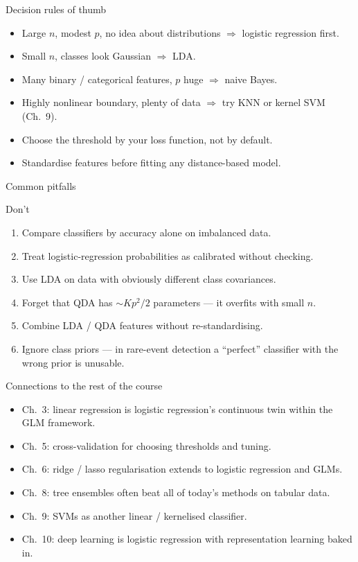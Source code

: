 \documentclass[aspectratio=169,11pt]{beamer}
\begin{document}
\begin{frame}{Decision rules of thumb}
  \begin{itemize}
    \item Large $n$, modest $p$, no idea about distributions
          $\Rightarrow$ logistic regression first.
    \item Small $n$, classes look Gaussian $\Rightarrow$ LDA.
    \item Many binary / categorical features, $p$ huge $\Rightarrow$
          naive Bayes.
    \item Highly nonlinear boundary, plenty of data $\Rightarrow$ try
          KNN or kernel SVM (Ch.~9).
    \item Choose the threshold by your loss function, not by default.
    \item Standardise features before fitting any distance-based model.
  \end{itemize}
\end{frame}

\begin{frame}{Common pitfalls}
  \begin{alertblock}{Don't}
    \begin{enumerate}
      \item Compare classifiers by accuracy alone on imbalanced data.
      \item Treat logistic-regression probabilities as calibrated
            without checking.
      \item Use LDA on data with obviously different class
            covariances.
      \item Forget that QDA has $\sim K p^2/2$ parameters --- it overfits
            with small $n$.
      \item Combine LDA / QDA features without re-standardising.
      \item Ignore class priors --- in rare-event detection a
            ``perfect'' classifier with the wrong prior is unusable.
    \end{enumerate}
  \end{alertblock}
\end{frame}

\begin{frame}{Connections to the rest of the course}
  \begin{itemize}
    \item Ch.~3: linear regression is logistic regression's continuous
          twin within the GLM framework.
    \item Ch.~5: cross-validation for choosing thresholds and tuning.
    \item Ch.~6: ridge / lasso regularisation extends to logistic
          regression and GLMs.
    \item Ch.~8: tree ensembles often beat all of today's methods on
          tabular data.
    \item Ch.~9: SVMs as another linear / kernelised classifier.
    \item Ch.~10: deep learning is logistic regression with
          representation learning baked in.
  \end{itemize}
\end{frame}
\end{document}
